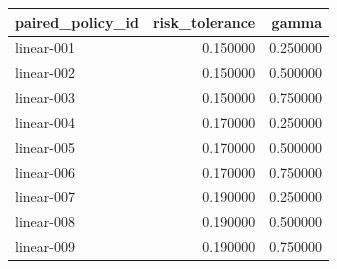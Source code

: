 \begin{tabular}{lrr}
\toprule
paired\_policy\_id & risk\_tolerance & gamma \\
\midrule
linear-001 & 0.150000 & 0.250000 \\
linear-002 & 0.150000 & 0.500000 \\
linear-003 & 0.150000 & 0.750000 \\
linear-004 & 0.170000 & 0.250000 \\
linear-005 & 0.170000 & 0.500000 \\
linear-006 & 0.170000 & 0.750000 \\
linear-007 & 0.190000 & 0.250000 \\
linear-008 & 0.190000 & 0.500000 \\
linear-009 & 0.190000 & 0.750000 \\
\bottomrule
\end{tabular}
